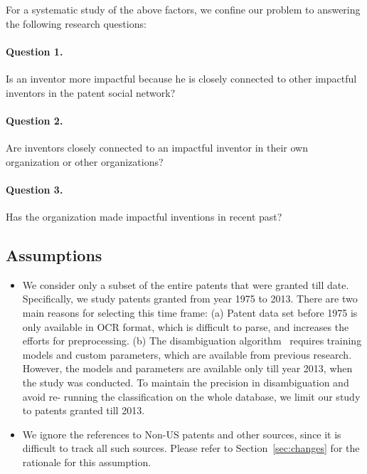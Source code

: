 For a systematic study of the above factors, we confine our problem to
answering the following research questions:

\paragraph{Question 1.} Is an inventor more impactful because he is closely
connected to other impactful inventors in the patent social network? 

\paragraph{Question  2.} Are inventors closely connected to an impactful
inventor in their own organization or other organizations? %

\paragraph{Question  3.} Has the organization made impactful inventions in
recent past? %


\subsection{Assumptions}
\label{sec:assumptions}


	\begin{itemize}
	\squish
		
		\item We consider only a subset of the entire patents that were granted till
		date. Specifically, we study patents granted from year 1975 to 2013. There are
		two main reasons for selecting this time frame: (a) Patent data set before
		1975 is only available in OCR format, which is difficult to parse, and
		increases the efforts for preprocessing. (b) The disambiguation algorithm~\cite{disambiguation} 
		requires training models and custom parameters, which are available from previous research. However,
		the models and parameters are available only till year 2013, when the study
		was conducted. To maintain the precision in disambiguation and avoid re-
		running the classification on the whole database, we limit our study to
		patents granted till 2013.

		\item We ignore the references to Non-US patents and other sources, since it
		is difficult to track all such sources. Please refer to
		Section~\ref{sec:changes} for the rationale for this assumption.
	\end{itemize}


